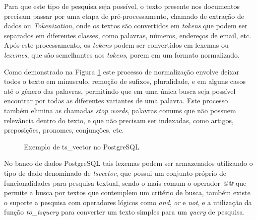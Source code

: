 Para que este tipo de pesquisa seja possível, o texto presente nos documentos precisam
passar por uma etapa de pré-processamento, chamado de extração de dados ou \emph{Tokenization},
onde os textos são convertidos em \emph{tokens} que podem ser separados em diferentes classes,
como palavras, números, endereços de email, etc. Após este processamento, os \emph{tokens}
podem ser convertidos em lexemas ou \emph{lexemes}, que são semelhantes aos \emph{tokens},
porem em um formato normalizado.

Como demonstrado na Figura \ref{fig:ts-vector-exemple} este processo de normalização envolve
deixar todos o texto em minusculo, remoção de sufixos, pluralidade, e em alguns casos até o
gênero das palavras, permitindo que em uma única busca seja possível encontrar por todas as
diferentes variantes de uma palavra. Este processo também elimina as chamadas \emph{stop words},
palavras comuns que não possuem relevância dentro do texto, e que não precisam ser indexadas,
como artigos, preposições, pronomes, conjunções, etc.

\begin{figure}[H]
    \caption{Exemplo de ts\_vector no PostgreSQL}
    \centering
    \label{fig:ts-vector-exemple}
\end{figure}

No banco de dados PostgreSQL tais lexemas podem ser armazenados utilizando o tipo de
dado denominado de \emph{tsvector}, que possui um conjunto próprio de funcionalidades
para pesquisa textual, sendo o mais comum o operador \emph{@@} que permite a busca por textos
que contemplem um critério de busca, também existe o suporte a pesquisa com operadores lógicos
como \emph{and}, \emph{or} e \emph{not}, e a utilização da função \emph{to\_tsquery} para
converter um texto simples para um \emph{query} de pesquisa.



